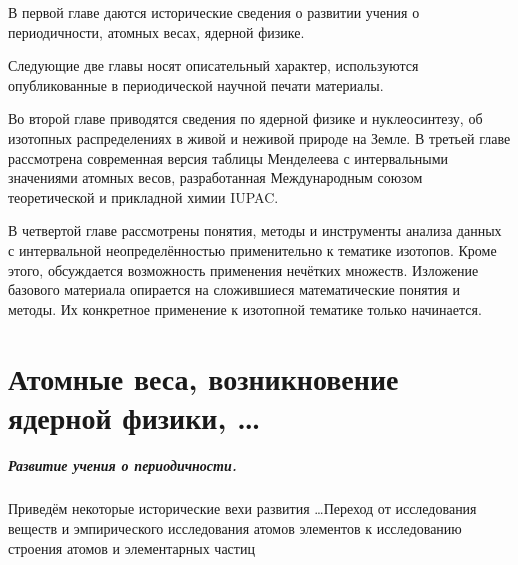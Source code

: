 \documentclass[a5paper,openany]{book}
\begin{document}
	В первой главе даются исторические сведения о развитии учения о периодичности, атомных весах, ядерной физике. 
	
	Следующие две главы носят описательный характер, используются опубликованные в периодической научной печати материалы. 
	
	Во второй главе приводятся сведения по ядерной физике и нуклеосинтезу, об изотопных распределениях в живой и неживой природе на Земле.
	В третьей главе
	рассмотрена современная версия таблицы Менделеева с интервальными значениями атомных весов, разработанная Международным союзом теоретической и прикладной химии IUPAC. 
	
	В четвертой главе
	рассмотрены понятия, методы и инструменты анализа данных с интервальной неопределённостью применительно к тематике изотопов.
	Кроме этого, обсуждается возможность применения нечётких множеств.
	Изложение базового материала опирается на сложившиеся математические понятия и методы.
	Их конкретное применение к изотопной тематике только начинается. 
	
	\chapter{Атомные веса, возникновение ядерной физики, \ldots}
	
	\paragraph{Развитие учения о периодичности.}
	Приведём некоторые исторические вехи развития \cite{Trifonov1974, Scerri2019, Bekman} \ldots Переход от исследования веществ и эмпирического исследования атомов элементов к исследованию строения атомов и элементарных частиц
	
\end{document}
